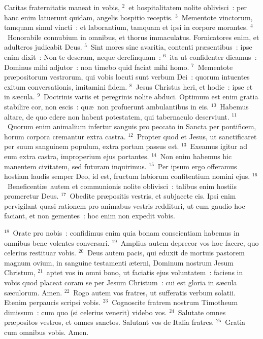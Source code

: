 \bchapter
\lettrine[lines=3,image=true,loversize=0.05,lraise=-0.03]{C}{}aritas fraternitatis maneat in vobis,
${}^{2}$~et hospitalitatem nolite oblivisci~: per hanc enim latuerunt quidam, angelis hospitio receptis.
${}^{3}$~Mementote vinctorum, tamquam simul vincti~: et laborantium, tamquam et ipsi in corpore morantes.
${}^{4}$~Honorabile connubium in omnibus, et thorus immaculatus. Fornicatores enim, et adulteros judicabit Deus.
${}^{5}$~Sint mores sine avaritia, contenti pr\ae sentibus~: ipse enim dixit~: Non te deseram, neque derelinquam~:
${}^{6}$~ita ut confidenter dicamus~: Dominus mihi adjutor~: non timebo quid faciat mihi homo.
${}^{7}$~Mementote pr\ae positorum vestrorum, qui vobis locuti sunt verbum Dei~: quorum intuentes exitum conversationis, imitamini fidem.
${}^{8}$~Jesus Christus heri, et hodie~: ipse et in s\ae cula.
${}^{9}$~Doctrinis variis et peregrinis nolite abduci. Optimum est enim gratia stabilire cor, non escis~: qu\ae\ non profuerunt ambulantibus in eis.
${}^{10}$~Habemus altare, de quo edere non habent potestatem, qui tabernaculo deserviunt.
${}^{11}$~Quorum enim animalium infertur sanguis pro peccato in Sancta per pontificem, horum corpora cremantur extra castra.
${}^{12}$~Propter quod et Jesus, ut sanctificaret per suum sanguinem populum, extra portam passus est.
${}^{13}$~Exeamus igitur ad eum extra castra, improperium ejus portantes.
${}^{14}$~Non enim habemus hic manentem civitatem, sed futuram inquirimus.
${}^{15}$~Per ipsum ergo offeramus hostiam laudis semper Deo, id est, fructum labiorum confitentium nomini ejus.
${}^{16}$~Beneficenti\ae\ autem et communionis nolite oblivisci~: talibus enim hostiis promeretur Deus.
${}^{17}$~Obedite pr\ae positis vestris, et subjacete eis. Ipsi enim pervigilant quasi rationem pro animabus vestris reddituri, ut cum gaudio hoc faciant, et non gementes~: hoc enim non expedit vobis.


${}^{18}$~Orate pro nobis~: confidimus enim quia bonam conscientiam habemus in omnibus bene volentes conversari.
${}^{19}$~Amplius autem deprecor vos hoc facere, quo celerius restituar vobis.
${}^{20}$~Deus autem pacis, qui eduxit de mortuis pastorem magnum ovium, in sanguine testamenti \ae terni, Dominum nostrum Jesum Christum,
${}^{21}$~aptet vos in omni bono, ut faciatis ejus voluntatem~: faciens in vobis quod placeat coram se per Jesum Christum~: cui est gloria in s\ae cula s\ae culorum. Amen.
${}^{22}$~Rogo autem vos fratres, ut sufferatis verbum solatii. Etenim perpaucis scripsi vobis.
${}^{23}$~Cognoscite fratrem nostrum Timotheum dimissum~: cum quo (si celerius venerit) videbo vos.
${}^{24}$~Salutate omnes pr\ae positos vestros, et omnes sanctos. Salutant vos de Italia fratres.
${}^{25}$~Gratia cum omnibus vobis. Amen.
